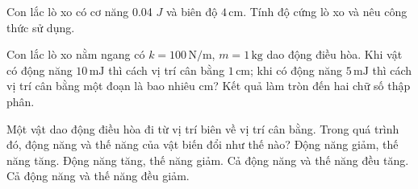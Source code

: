 \begin{ex}
Con lắc lò xo có cơ năng 0.04 $J$ và biên độ $4\,\text{cm}$. Tính độ cứng lò xo và nêu công thức sử dụng.
\choiceTF

\end{ex}

\begin{ex}
Con lắc lò xo nằm ngang có $k=100\,\text{N/m}$, $m=1\,\text{kg}$ dao động điều hòa. Khi vật có động năng $10\,\text{mJ}$ thì cách vị trí cân bằng $1\,\text{cm}$; khi có động năng $5\,\text{mJ}$ thì cách vị trí cân bằng một đoạn là bao nhiêu cm? Kết quả làm tròn đến hai chữ số thập phân.
\end{ex}

\begin{ex}
Một vật dao động điều hòa đi từ vị trí biên về vị trí cân bằng. Trong quá trình đó, động năng và thế năng của vật biến đổi như thế nào?
\choice
{Động năng giảm, thế năng tăng.}
{\True Động năng tăng, thế năng giảm.}
{Cả động năng và thế năng đều tăng.}
{Cả động năng và thế năng đều giảm.}
\end{ex}

